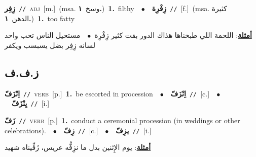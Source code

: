 \documentclass[10pt,a4paper,twoside]{article} %
\begin{document}
\begin{multicols}{2}
{\setlength\topsep{0pt}\textbf{\foreignlanguage{arabic}{زِفِر}}\ {\color{gray}\texttt{//}\color{black}}\ \textsc{adj}\ [m.]\ \color{gray}(msa. \foreignlanguage{arabic}{وسخ}~\foreignlanguage{arabic}{\textbf{١.}})\color{black}\ \textbf{1.}~filthy\ \ $\bullet$\ \ \setlength\topsep{0pt}\textbf{\foreignlanguage{arabic}{زِفْرِة}}\ {\color{gray}\texttt{//}\color{black}}\ [f.]\ \color{gray}(msa. \foreignlanguage{arabic}{كثيرة الدهن}~\foreignlanguage{arabic}{\textbf{١.}})\color{black}\ \textbf{1.}~too fatty\  \begin{flushright}\color{gray}\foreignlanguage{arabic}{\textbf{\underline{\foreignlanguage{arabic}{أمثلة}}}: اللحمة اللي طبخناها هذاك الدور بقت كثير زِفْرِة\ $\bullet$\ \  مستحيل الناس تحب واحد لسانه زِفِر بضل يسبسب ويكفر}\end{flushright}\color{black}} \vspace{2mm}

\vspace{-3mm}
\subsection*{\color{blue}\foreignlanguage{arabic}{ز.ف.ف}\color{blue}{}} 

{\setlength\topsep{0pt}\textbf{\foreignlanguage{arabic}{اِنْزَفّ}}\ {\color{gray}\texttt{//}\color{black}}\ \textsc{verb}\ [p.]\ \textbf{1.}~be escorted in procession\ \ $\bullet$\ \ \setlength\topsep{0pt}\textbf{\foreignlanguage{arabic}{اِنْزَفّ}}\ {\color{gray}\texttt{//}\color{black}}\ [c.]\ \ $\bullet$\ \ \setlength\topsep{0pt}\textbf{\foreignlanguage{arabic}{يِنْزَفّ}}\ {\color{gray}\texttt{//}\color{black}}\ [i.]\ } \vspace{2mm}

{\setlength\topsep{0pt}\textbf{\foreignlanguage{arabic}{زَفّ}}\ {\color{gray}\texttt{//}\color{black}}\ \textsc{verb}\ [p.]\ \textbf{1.}~conduct a ceremonial procession (in weddings or other celebrations).\ \ $\bullet$\ \ \setlength\topsep{0pt}\textbf{\foreignlanguage{arabic}{زِفّ}}\ {\color{gray}\texttt{//}\color{black}}\ [c.]\ \ $\bullet$\ \ \setlength\topsep{0pt}\textbf{\foreignlanguage{arabic}{يزِفّ}}\ {\color{gray}\texttt{//}\color{black}}\ [i.]\  \begin{flushright}\color{gray}\foreignlanguage{arabic}{\textbf{\underline{\foreignlanguage{arabic}{أمثلة}}}: يوم الإِثنين بدل ما نزِفُّه عريس، زَفِّيناه شهيد}\end{flushright}\color{black}} \vspace{2mm}


\end{multicols}
\end{document}
